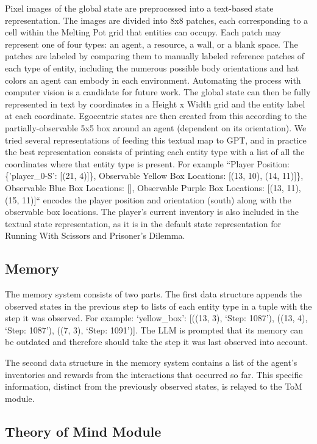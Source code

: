 \documentclass{article} %
\begin{document}
Pixel images of the global state are preprocessed into a text-based state representation. The images are divided into 8x8 patches, each corresponding to a cell within the Melting Pot grid that entities can occupy. Each patch may represent one of four types: an agent, a resource, a wall, or a blank space. The patches are labeled by comparing them to manually labeled reference patches of each type of entity, including the numerous possible body orientations and hat colors an agent can embody in each environment. Automating the process with computer vision is a candidate for future work. The global state can then be fully represented in text by coordinates in a Height x Width grid and the entity label at each coordinate. Egocentric states are then created from this according to the partially-observable 5x5 box around an agent (dependent on its orientation). We tried several representations of feeding this textual map to GPT, and in practice the best representation consists of printing each entity type with a list of all the coordinates where that entity type is present. For example ``Player Position: \{'player\_0-S': [(21, 4)]\}, Observable Yellow Box Locations: [(13, 10), (14, 11)]\}, Observable Blue Box Locations: [], Observable Purple Box Locations: [(13, 11), (15, 11)]`` encodes the player position and orientation (south) along with the observable box locations. The player's current inventory is also included in the textual state representation, as it is in the default state representation for Running With Scissors and Prisoner's Dilemma.

\subsection{Memory}

The memory system consists of two parts. The first data structure appends the observed states in the previous step to lists of each entity type in a tuple with the step it was observed. For example: `yellow\_box': [((13, 3), `Step: 1087'), ((13, 4), `Step: 1087'), ((7, 3), `Step: 1091')]. The LLM is prompted that its memory can be outdated and therefore should take the step it was last observed into account.

The second data structure in the memory system contains a list of the agent's inventories and rewards from the interactions that occurred so far. This specific information, distinct from the previously observed states, is relayed to the ToM module.

\subsection{Theory of Mind Module}
\end{document}
